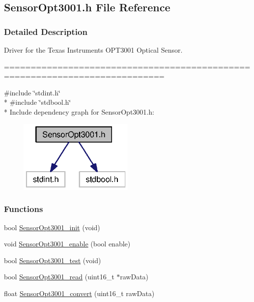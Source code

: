 \subsection{Sensor\+Opt3001.\+h File Reference}
\label{_sensor_opt3001_8h}


\subsubsection{Detailed Description}
Driver for the Texas Instruments O\+P\+T3001 Optical Sensor. 

============================================================================



{\ttfamily \#include \char`\"{}stdint.\+h\char`\"{}}\\*
{\ttfamily \#include \char`\"{}stdbool.\+h\char`\"{}}\\*
Include dependency graph for Sensor\+Opt3001.\+h\+:
\nopagebreak
\begin{figure}[H]
\begin{center}
\leavevmode
\includegraphics[width=159pt]{_sensor_opt3001_8h__incl}
\end{center}
\end{figure}
\subsubsection*{Functions}
\begin{DoxyCompactItemize}
\item 
bool \hyperlink{_sensor_opt3001_8h_a3fbdc09a70a2163b6d8306f576b283e6}{Sensor\+Opt3001\+\_\+init} (void)
\item 
void \hyperlink{_sensor_opt3001_8h_a808e4a66fe92861826be1839c52fa5c8}{Sensor\+Opt3001\+\_\+enable} (bool enable)
\item 
bool \hyperlink{_sensor_opt3001_8h_a4ef6da44db0eb355f4beadb4a8c82c85}{Sensor\+Opt3001\+\_\+test} (void)
\item 
bool \hyperlink{_sensor_opt3001_8h_a09d7936923f9975cf62a45293f9a2b80}{Sensor\+Opt3001\+\_\+read} (uint16\+\_\+t $\ast$raw\+Data)
\item 
float \hyperlink{_sensor_opt3001_8h_aad530aec23335407ea1d31e0bdf3adff}{Sensor\+Opt3001\+\_\+convert} (uint16\+\_\+t raw\+Data)
\end{DoxyCompactItemize}


